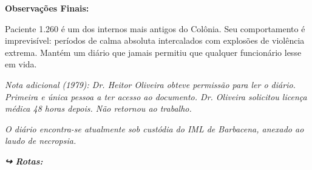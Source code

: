\noindent \textbf{Observações Finais:}

\noindent Paciente 1.260 é um dos internos mais antigos do Colônia. Seu comportamento é imprevisível: períodos de calma absoluta intercalados com explosões de violência extrema. Mantém um diário que jamais permitiu que qualquer funcionário lesse em vida.

\noindent \textit{Nota adicional (1979): Dr. Heitor Oliveira obteve permissão para ler o diário. Primeira e única pessoa a ter acesso ao documento. Dr. Oliveira solicitou licença médica 48 horas depois. Não retornou ao trabalho.}

\noindent \textit{O diário encontra-se atualmente sob custódia do IML de Barbacena, anexado ao laudo de necropsia.}

\vspace{0.5em}
\noindent\textit{\textbf{↪ Rotas:}  \rotasep {} \rotasep {}}
